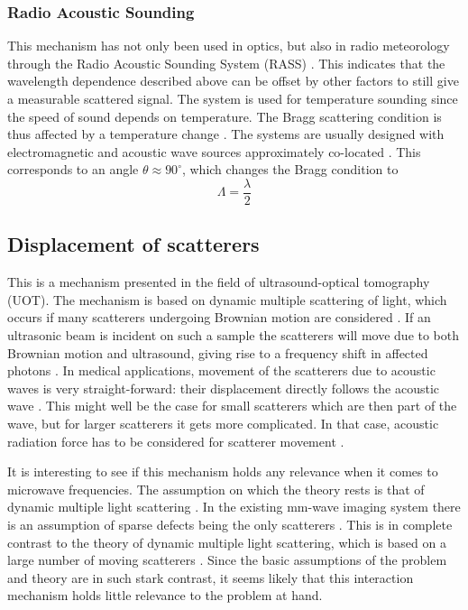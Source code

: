 \documentclass[10pt,a4paper,draft]{scrartcl}
\begin{document}
	\subsubsection{Radio Acoustic Sounding}
	This mechanism has not only been used in optics, but also in radio meteorology through the Radio Acoustic Sounding System (RASS) \cite{Buerkle2007}. This indicates that the wavelength dependence described above can be offset by other factors to still give a measurable scattered signal. The system is used for temperature sounding since the speed of sound depends on temperature. The Bragg scattering condition is thus affected by a temperature change \cite{Marshall1972}. The systems are usually designed with electromagnetic and acoustic wave sources approximately co-located \cite{Marshall1972}. This corresponds to an angle $\theta \approx 90^\circ$, which changes the Bragg condition to
	\begin{equation*}
		\Lambda = \frac{\lambda}{2}
	\end{equation*}
	
	\subsection{Displacement of scatterers}
	This is a mechanism presented in the field of ultrasound-optical tomography (UOT). The mechanism is based on dynamic multiple scattering of light, which occurs if many scatterers undergoing Brownian motion are considered \cite{Leutz1995}. If an ultrasonic beam is incident on such a sample the scatterers will move due to both Brownian motion and ultrasound, giving rise to a frequency shift in affected photons \cite{Leutz1995}\cite{Elson2011}. In medical applications, movement of the scatterers due to acoustic waves is very straight-forward: their displacement directly follows the acoustic wave \cite{Leutz1995}. This might well be the case for small scatterers which are then part of the wave, but for larger scatterers it gets more complicated. In that case, acoustic radiation force has to be considered for scatterer movement \cite{Torr1984}.
	
	It is interesting to see if this mechanism holds any relevance when it comes to microwave frequencies. The assumption on which the theory rests is that of dynamic multiple light scattering \cite{Leutz1995}. In the existing mm-wave imaging system there is an assumption of sparse defects being the only scatterers \cite{Helander2017}. This is in complete contrast to the theory of dynamic multiple light scattering, which is based on a large number of moving scatterers \cite{Leutz1995}. Since the basic assumptions of the problem and theory are in such stark contrast, it seems likely that this interaction mechanism holds little relevance to the problem at hand.
	
\end{document}
